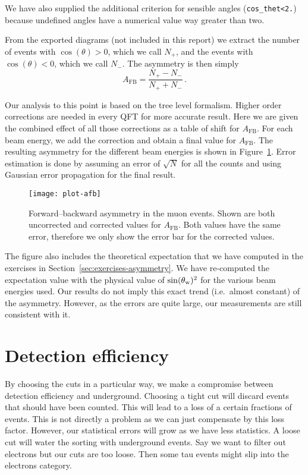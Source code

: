 \documentclass[11pt, english, fleqn, DIV=15, headinclude, BCOR=2cm]{scrreprt}
\begin{document}
We have also supplied the additional criterion for sensible angles
(\texttt{cos\_thet<2.}) because undefined angles have a numerical value way
greater than two.

From the exported diagrams (not included in this report) we extract the number
of events with $\cos(\theta) > 0$, which we call $N_+$, and the events with
$\cos(\theta) < 0$, which we call $N_-$. The asymmetry is then simply
\[
    A_\text{FB} = \frac{N_+ - N_-}{N_+ + N_-} \,.
\]

Our analysis to this point is based on the tree level formalism. Higher order
corrections are needed in every QFT for more accurate result. Here we are given
the combined effect of all those corrections as a table of shift for
$A_\text{FB}$. For each beam energy, we add the correction and obtain a final
value for $A_\text{FB}$. The resulting asymmetry for the different beam
energies is shown in Figure~\ref{fig:plot-afb}. Error estimation is done by
assuming an error of $\sqrt{N}$ for all the counts and using Gaussian error
propagation for the final result.

\begin{figure}
    \centering
    \texttt{[image: plot-afb]}
    \caption{%
        Forward--backward asymmetry in the muon events. Shown are both
        uncorrected and corrected values for $A_\text{FB}$. Both values have
        the same error, therefore we only show the error bar for the corrected
        values.
    }
    \label{fig:plot-afb}
\end{figure}

The figure also includes the theoretical expectation that we have computed in
the exercises in Section~\ref{sec:exercises-asymmetry}. We have re-computed the
expectation value with the physical value of $\sin(\theta_\text w)^2$ for the
various beam energies used. Our results do not imply this exact trend (i.e.\
almost constant) of the asymmetry. However, as the errors are quite large, our
measurements are still consistent with it.

\section{Detection efficiency}
\label{sec:detection-efficiency}

By choosing the cuts in a particular way, we make a compromise between
detection efficiency and underground. Choosing a tight cut will discard events
that should have been counted. This will lead to a loss of a certain fractions
of events. This is not directly a problem as we can just compensate by this
loss factor. However, our statistical errors will grow as we have less
statistics. A loose cut will water the sorting with underground events. Say we
want to filter out electrons but our cuts are too loose. Then some tau events
might slip into the electrons category.
\end{document}
